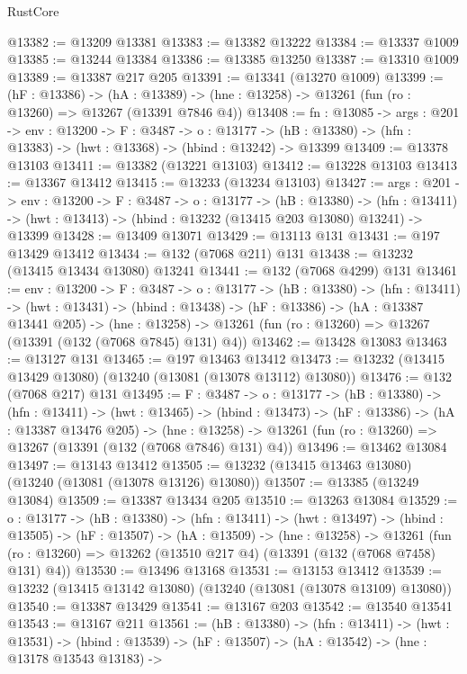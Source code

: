 \begin{lexlean}{RustCore}
\begin{coremodule}
@13382 := @13209 @13381
@13383 := @13382 @13222
@13384 := @13337 @1009
@13385 := @13244 @13384
@13386 := @13385 @13250
@13387 := @13310 @1009
@13389 := @13387 @217 @205
@13391 := @13341 (@13270 @1009)
@13399 := (hF : @13386) ->
  (hA : @13389) -> (hne : @13258) -> @13261 (fun (ro : @13260) => @13267 (@13391 @7846 @4))
@13408 := {fn : @13085} ->
  {args : @201} ->
  {env : @13200} ->
  {F : @3487} ->
  {o : @13177} -> (hB : @13380) -> (hfn : @13383) -> (hwt : @13368) -> (hbind : @13242) -> @13399
@13409 := @13378 @13103
@13411 := @13382 (@13221 @13103)
@13412 := @13228 @13103
@13413 := @13367 @13412
@13415 := @13233 (@13234 @13103)
@13427 := {args : @201} ->
  {env : @13200} ->
  {F : @3487} ->
  {o : @13177} ->
  (hB : @13380) ->
  (hfn : @13411) -> (hwt : @13413) -> (hbind : @13232 (@13415 @203 @13080) @13241) -> @13399
@13428 := @13409 @13071
@13429 := @13113 @131
@13431 := @197 @13429 @13412
@13434 := @132 (@7068 @211) @131
@13438 := @13232 (@13415 @13434 @13080) @13241
@13441 := @132 (@7068 @4299) @131
@13461 := {env : @13200} ->
  {F : @3487} ->
  {o : @13177} ->
  (hB : @13380) ->
  (hfn : @13411) ->
  (hwt : @13431) ->
  (hbind : @13438) ->
  (hF : @13386) ->
  (hA : @13387 @13441 @205) ->
  (hne : @13258) -> @13261 (fun (ro : @13260) => @13267 (@13391 (@132 (@7068 @7845) @131) @4))
@13462 := @13428 @13083
@13463 := @13127 @131
@13465 := @197 @13463 @13412
@13473 := @13232 (@13415 @13429 @13080) (@13240 (@13081 (@13078 @13112) @13080))
@13476 := @132 (@7068 @217) @131
@13495 := {F : @3487} ->
  {o : @13177} ->
  (hB : @13380) ->
  (hfn : @13411) ->
  (hwt : @13465) ->
  (hbind : @13473) ->
  (hF : @13386) ->
  (hA : @13387 @13476 @205) ->
  (hne : @13258) -> @13261 (fun (ro : @13260) => @13267 (@13391 (@132 (@7068 @7846) @131) @4))
@13496 := @13462 @13084
@13497 := @13143 @13412
@13505 := @13232 (@13415 @13463 @13080) (@13240 (@13081 (@13078 @13126) @13080))
@13507 := @13385 (@13249 @13084)
@13509 := @13387 @13434 @205
@13510 := @13263 @13084
@13529 := {o : @13177} ->
  (hB : @13380) ->
  (hfn : @13411) ->
  (hwt : @13497) ->
  (hbind : @13505) ->
  (hF : @13507) ->
  (hA : @13509) ->
  (hne : @13258) ->
  @13261 (fun (ro : @13260) => @13262 (@13510 @217 @4) (@13391 (@132 (@7068 @7458) @131) @4))
@13530 := @13496 @13168
@13531 := @13153 @13412
@13539 := @13232 (@13415 @13142 @13080) (@13240 (@13081 (@13078 @13109) @13080))
@13540 := @13387 @13429
@13541 := @13167 @203
@13542 := @13540 @13541
@13543 := @13167 @211
@13561 := (hB : @13380) ->
  (hfn : @13411) ->
  (hwt : @13531) ->
  (hbind : @13539) ->
  (hF : @13507) ->
  (hA : @13542) ->
  (hne : @13178 @13543 @13183) ->

\end{coremodule}
\end{lexlean}
